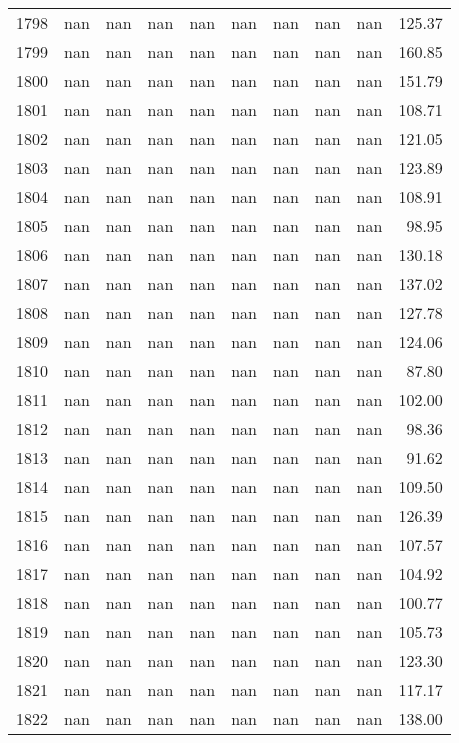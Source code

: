 \begin{tabular}{lrrrrrrrrr}
1798 & nan & nan & nan & nan & nan & nan & nan & nan & 125.37 \\
1799 & nan & nan & nan & nan & nan & nan & nan & nan & 160.85 \\
1800 & nan & nan & nan & nan & nan & nan & nan & nan & 151.79 \\
1801 & nan & nan & nan & nan & nan & nan & nan & nan & 108.71 \\
1802 & nan & nan & nan & nan & nan & nan & nan & nan & 121.05 \\
1803 & nan & nan & nan & nan & nan & nan & nan & nan & 123.89 \\
1804 & nan & nan & nan & nan & nan & nan & nan & nan & 108.91 \\
1805 & nan & nan & nan & nan & nan & nan & nan & nan & 98.95 \\
1806 & nan & nan & nan & nan & nan & nan & nan & nan & 130.18 \\
1807 & nan & nan & nan & nan & nan & nan & nan & nan & 137.02 \\
1808 & nan & nan & nan & nan & nan & nan & nan & nan & 127.78 \\
1809 & nan & nan & nan & nan & nan & nan & nan & nan & 124.06 \\
1810 & nan & nan & nan & nan & nan & nan & nan & nan & 87.80 \\
1811 & nan & nan & nan & nan & nan & nan & nan & nan & 102.00 \\
1812 & nan & nan & nan & nan & nan & nan & nan & nan & 98.36 \\
1813 & nan & nan & nan & nan & nan & nan & nan & nan & 91.62 \\
1814 & nan & nan & nan & nan & nan & nan & nan & nan & 109.50 \\
1815 & nan & nan & nan & nan & nan & nan & nan & nan & 126.39 \\
1816 & nan & nan & nan & nan & nan & nan & nan & nan & 107.57 \\
1817 & nan & nan & nan & nan & nan & nan & nan & nan & 104.92 \\
1818 & nan & nan & nan & nan & nan & nan & nan & nan & 100.77 \\
1819 & nan & nan & nan & nan & nan & nan & nan & nan & 105.73 \\
1820 & nan & nan & nan & nan & nan & nan & nan & nan & 123.30 \\
1821 & nan & nan & nan & nan & nan & nan & nan & nan & 117.17 \\
1822 & nan & nan & nan & nan & nan & nan & nan & nan & 138.00 \\

\end{tabular}
